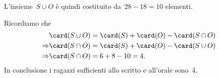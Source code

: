 \begin{exrig}
\begin{esempio}
L'insieme~$S\cup O$ è quindi costituito da~$28-18=10$ elementi.

Ricordiamo che
\begin{align*}
 &\card(S\cup O)=\card(S)+\card(O)-\card(S\cap O)\\
 \Rightarrow &\card(S\cap O)=\card(S)+\card(O)-\card(S\cup O)\\
 \Rightarrow &\card(S\cap O)=6+8-10=4.
\end{align*}
In conclusione i ragazzi sufficienti allo scritto e all'orale sono~4.
\end{esempio}
\end{exrig}

\ovalbox{\risolvii \ref{ese:7.38}, \ref{ese:7.39}, \ref{ese:7.40}, \ref{ese:7.41}, \ref{ese:7.42}, \ref{ese:7.43}, \ref{ese:7.44}, \ref{ese:7.45}, \ref{ese:7.46}, \ref{ese:7.47},
\ref{ese:7.48}, \ref{ese:7.49}, \ref{ese:7.50}}

\vspazio\ovalbox{\ref{ese:7.51}}
\newpage
 
\cleardoublepage
